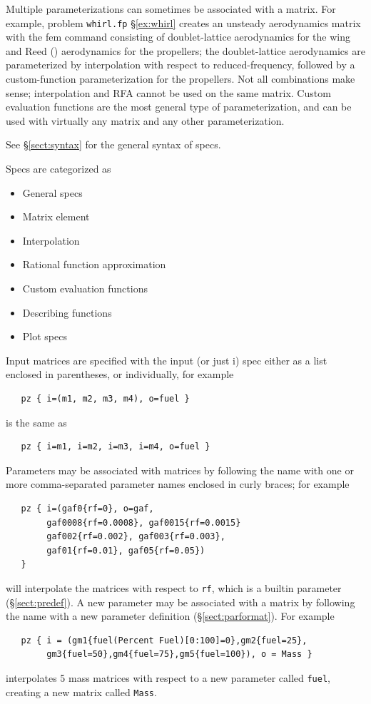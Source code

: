 \documentclass[11pt,openany,twoside]{book}
\numberwithin{equation}{section}		%
\newcommand{\Cmd}[1]{{\sf #1}}
\newcommand{\Code}[1]{{\small\tt #1}}
\newcommand{\Spec}[1]{{\small\ttfamily #1}}
\newcommand{\Sectref}[1]{\S\ref{#1}}
\begin{document}
\par
Multiple parameterizations can sometimes be associated with
a matrix. For example, problem \Code{whirl.fp} \Sectref{ex:whirl}
creates an unsteady aerodynamics matrix with the \Cmd{fem} command
consisting of doublet-lattice aerodynamics for the wing and Reed
(\cite{reed1961analytical})
aerodynamics for the propellers; the doublet-lattice aerodynamics
are parameterized by interpolation with respect to reduced-frequency,
followed by a custom-function parameterization for the propellers.
Not all combinations make sense; interpolation and RFA cannot
be used on the same matrix. Custom evaluation functions
are the most general type of parameterization, and
can be used with virtually any matrix and any other parameterization.

See \Sectref{sect:syntax} for the general syntax of specs.
\par
Specs are categorized as
\begin{itemize}
\item General specs
\item Matrix element
\item Interpolation
\item Rational function approximation
\item Custom evaluation functions
\item Describing functions
\item Plot specs
\end{itemize}

Input matrices are specified with the \Spec{input} (or just \Spec{i})
spec either as a list enclosed in parentheses, or individually, for example
\begin{lstlisting}
   pz { i=(m1, m2, m3, m4), o=fuel }
\end{lstlisting}
is the same as
\begin{lstlisting}
   pz { i=m1, i=m2, i=m3, i=m4, o=fuel }
\end{lstlisting}

Parameters may be associated with matrices by following the
name with one or more comma-separated parameter names
enclosed in curly braces; for example
\begin{lstlisting}
   pz { i=(gaf0{rf=0}, o=gaf,
        gaf0008{rf=0.0008}, gaf0015{rf=0.0015}
        gaf002{rf=0.002}, gaf003{rf=0.003},
        gaf01{rf=0.01}, gaf05{rf=0.05})
   }
\end{lstlisting}
will interpolate the matrices with respect to \Code{rf},
which is a builtin parameter (\Sectref{sect:predef}).
A new parameter
may be associated with a matrix by following the
name with a new parameter definition (\Sectref{sect:parformat}).
For example
\begin{lstlisting}
   pz { i = (gm1{fuel(Percent Fuel)[0:100]=0},gm2{fuel=25},
        gm3{fuel=50},gm4{fuel=75},gm5{fuel=100}), o = Mass }
\end{lstlisting}
interpolates 5 mass matrices with respect to a new
parameter called \Code{fuel},
creating a new matrix called \Code{Mass}.
\end{document}
